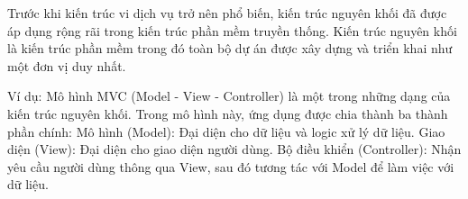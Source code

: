 Trước khi kiến trúc vi dịch vụ trở nên phổ biến, kiến trúc nguyên khối đã được áp dụng rộng rãi trong kiến trúc phần mềm truyền thống. Kiến trúc nguyên khối là kiến trúc phần mềm trong đó toàn bộ dự án được xây dựng và triển khai như một đơn vị duy nhất.

Ví dụ: Mô hình MVC (Model - View - Controller) là một trong những dạng của kiến trúc nguyên khối.
Trong mô hình này, ứng dụng được chia thành ba thành phần chính:
Mô hình (Model): Đại diện cho dữ liệu và logic xử lý dữ liệu.
Giao diện (View): Đại diện cho giao diện người dùng.
Bộ điều khiển (Controller): Nhận yêu cầu người dùng thông qua View, sau đó tương tác với Model để làm việc với dữ liệu.
